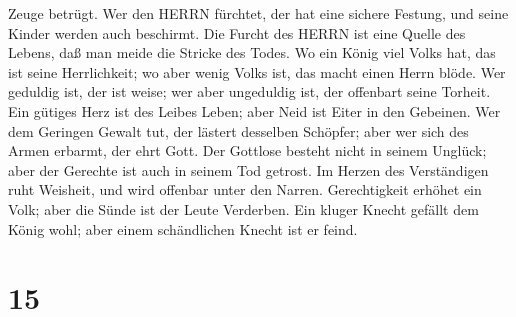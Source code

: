 Zeuge betrügt.  Wer den HERRN fürchtet, der hat eine
sichere Festung, und seine Kinder werden auch beschirmt. 
Die Furcht des HERRN ist eine Quelle des Lebens, daß man meide die
Stricke des Todes.  Wo ein König viel Volks hat, das ist
seine Herrlichkeit; wo aber wenig Volks ist, das macht einen Herrn
blöde.  Wer geduldig ist, der ist weise; wer aber
ungeduldig ist, der offenbart seine Torheit.  Ein gütiges
Herz ist des Leibes Leben; aber Neid ist Eiter in den Gebeinen.
 Wer dem Geringen Gewalt tut, der lästert desselben
Schöpfer; aber wer sich des Armen erbarmt, der ehrt Gott. 
Der Gottlose besteht nicht in seinem Unglück; aber der Gerechte ist auch
in seinem Tod getrost.  Im Herzen des Verständigen ruht
Weisheit, und wird offenbar unter den Narren. 
Gerechtigkeit erhöhet ein Volk; aber die Sünde ist der Leute Verderben.
 Ein kluger Knecht gefällt dem König wohl; aber einem
schändlichen Knecht ist er feind.

\hypertarget{section-14}{%
\section{15}\label{section-14}}

